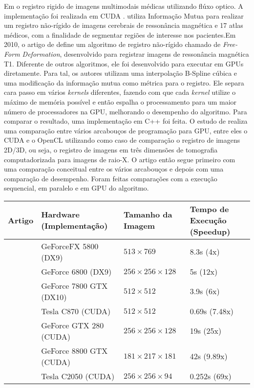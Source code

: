   Em \cite{bui2009performance} o registro rigido de imagens multimodais médicas
utilizando flúxo optico. A implementação foi realizada em CUDA
\cite{nvidia2007compute}. \cite{han2009gpu} utiliza Informação Mutua para
realizar um registro não-rígido de imagens cerebrais de ressonância magnética
e 17 atlas médicos, com a finalidade de segmentar regiões de interesse nos
pacientes.Em 2010, o artigo de \cite{modat2010fast} define um algoritmo de
registro não-rígido chamado de \textit{Free-Form Deformation}, desenvolvido
para registrar imagens de ressonância magnética T1. Diferente de outros
algoritmos, ele foi desenvolvido para executar em GPUs diretamente. Para tal,
os autores utilizam uma interpolação B-Spline cúbica e uma modificação da
informação mutua como métrica para o registro. Ele separa cara passo em vários
\textit{kernels} diferentes, fazendo com que cada \textit{kernel} utilize o
máximo de memória possível e então espalha o processamento para um maior número
de processadores na GPU, melhorando o desempenho do algoritmo. Para comparar o
resultado, uma implementação em C++ foi feita. O estudo de
\cite{membarth2011frameworks} realiza uma comparação entre vários arcabouços de
programação para GPU, entre eles o CUDA e o OpenCL utilizando como caso de
comparação o registro de imagens 2D/3D, ou seja, o registro de imagens em três
dimensões de tomografia computadorizada para imagens de raio-X. O artigo então
segue primeiro com uma comparação conceitual entre os vários arcabouços e
depois com uma comparação de desempenho. Foram feitas comparações com a
execução sequencial, em paralelo e em GPU do algoritmo.

\begin{center}
  \begin{tabular}{| l | l | l | p{6em} |}
  \hline
  Artigo & Hardware (Implementação) & Tamanho da Imagem & Tempo de Execução (Speedup) \\ \hline
  \cite{strzodka2004image} & GeForceFX 5800 (DX9) & $513 \times 769$ & 8.3s (4x) \\ \hline
  \cite{kohn2006gpu} & GeForce 6800 (DX9) & $256 \times 256 \times 128$ & 5s (12x) \\ \hline
  \cite{vetter2007non} & GeForce 7800 GTX (DX10) & $512 \times 512$ & 3.9s (6x) \\ \hline
  \cite{bui2009performance} & Tesla C870 (CUDA) & $512 \times 512$ & 0.69s (7.48x) \\ \hline
  \cite{han2009gpu} & GeForce GTX 280 (CUDA) & $256 \times 256 \times 128$ & 19s (25x) \\ \hline
  \cite{modat2010fast} & GeForce 8800 GTX (CUDA) & $181 \times 217 \times 181$ & 42s (9.89x) \\ \hline
  \cite{luo2014gpu} & Tesla C2050 (CUDA) & $256 \times 256 \times 94$ & 0.252s (69x) \\ \hline
  \end{tabular}
\end{center}

